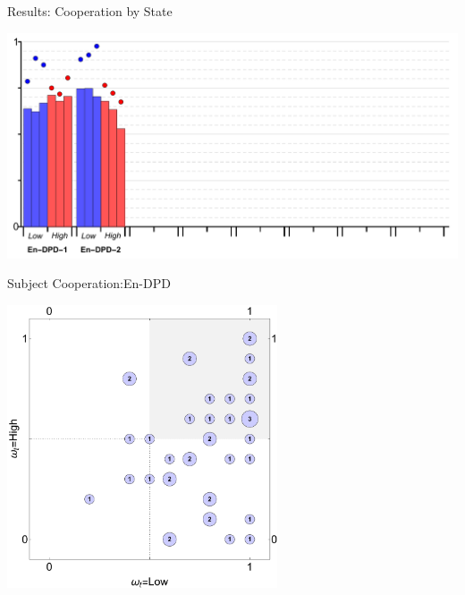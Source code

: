 \documentclass{beamer}
\begin{document}
\begin{frame}{Results: Cooperation by State}
\begin{card}
\begin{center}
	\includegraphics[width=1.0\textwidth]{./i/col_bar_StateCoop_block_EnDPD_2.pdf}
\end{center}
\end{card}
\end{frame}

\begin{frame}{Subject Cooperation:En-DPD }
\begin{card}
\begin{center}
	\includegraphics[width=0.6\textwidth]{./i/col_subject_stateCooperation_L5_EnDPD_2.pdf}
\end{center}
\end{card}
\end{frame}
\end{document}
